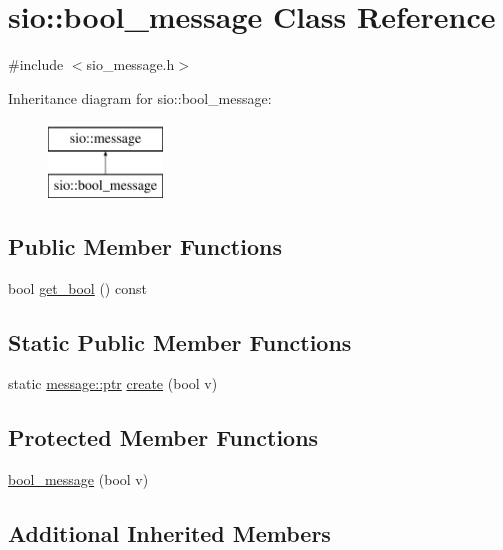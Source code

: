\hypertarget{classsio_1_1bool__message}{}\section{sio\+:\+:bool\+\_\+message Class Reference}
\label{classsio_1_1bool__message}


{\ttfamily \#include $<$sio\+\_\+message.\+h$>$}

Inheritance diagram for sio\+:\+:bool\+\_\+message\+:\begin{figure}[H]
\begin{center}
\leavevmode
\includegraphics[height=2.000000cm]{classsio_1_1bool__message}
\end{center}
\end{figure}
\subsection*{Public Member Functions}
\begin{DoxyCompactItemize}
\item 
bool \hyperlink{classsio_1_1bool__message_aca66ff64b5ac4198c5292e26abdf9e92}{get\+\_\+bool} () const
\end{DoxyCompactItemize}
\subsection*{Static Public Member Functions}
\begin{DoxyCompactItemize}
\item 
static \hyperlink{classsio_1_1message_a6340b6fef57e4516eb17928b1885a615}{message\+::ptr} \hyperlink{classsio_1_1bool__message_a6742ca3443bd90ad25e3aa4ff5f20459}{create} (bool v)
\end{DoxyCompactItemize}
\subsection*{Protected Member Functions}
\begin{DoxyCompactItemize}
\item 
\hyperlink{classsio_1_1bool__message_a06e4eb255118501266a40d1ddcfd5d76}{bool\+\_\+message} (bool v)
\end{DoxyCompactItemize}
\subsection*{Additional Inherited Members}


